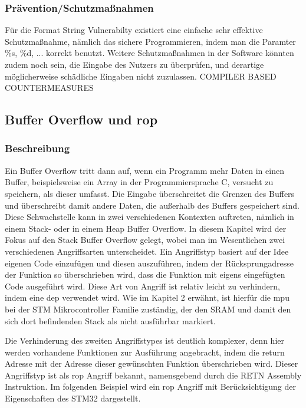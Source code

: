 \documentclass[a4paper,
DIV=13,
12pt,
BCOR=10mm,
department=FakIM,
oneside,
parskip=half,
automark,
listof=totocnumbered,
bibliography=totocnumbered,
acronym=totocnumbered
] {OTHRartcl}
\begin{document}
\subsubsection{Prävention/Schutzmaßnahmen}
Für die Format String Vulnerabilty existiert eine einfache sehr effektive Schutzmaßnahme, nämlich
das sichere Programmieren, indem man die Paramter \%s, \%d, ... korrekt benutzt.
Weitere Schutzmaßnahmen in der Software könnten zudem noch sein, die Eingabe des Nutzers zu überprüfen, und
derartige möglicherweise schädliche Eingaben nicht zuzulassen.
COMPILER BASED COUNTERMEASURES

\subsection{Buffer Overflow und \ac{rop}}
\subsubsection{Beschreibung}
Ein Buffer Overflow tritt dann auf, wenn ein Programm mehr Daten in einen Buffer, beispielsweise ein Array in der Programmiersprache C, versucht zu speichern, als
dieser umfasst.
Die Eingabe überschreitet die Grenzen des Buffers und überschreibt damit andere Daten, die außerhalb des Buffers gespeichert sind.
Diese Schwachstelle kann in zwei verschiedenen Kontexten auftreten, nämlich in einem Stack- oder in einem Heap Buffer Overflow.
In diesem Kapitel wird der Fokus auf den Stack Buffer Overflow gelegt, wobei man im Wesentlichen zwei verschiedenen Angriffsarten unterscheidet.
Ein Angriffstyp basiert auf der Idee eigenen Code einzufügen und diesen auszuführen, indem der Rücksprungadresse der Funktion so überschrieben wird, dass die Funktion
mit eigens eingefügten Code ausgeführt wird. Diese Art von Angriff ist relativ leicht zu verhindern, indem eine \ac{dep} verwendet wird.
Wie im Kapitel 2 erwähnt, ist hierfür die \ac{mpu} bei der STM Mikrocontroller Familie zuständig, der den SRAM und damit den sich dort befindenden Stack als nicht ausführbar markiert.

Die Verhinderung des zweiten Angriffstypes ist deutlich komplexer, denn hier werden vorhandene Funktionen zur Ausführung angebracht, indem die return Adresse mit der Adresse
dieser gewünschten Funktion überschrieben wird. %
Dieser Angriffstyp ist als \ac{rop} Angriff bekannt, namensgebend durch die RETN Assembly Instruktion.
Im folgenden Beispiel wird ein \ac{rop} Angriff mit Berücksichtigung der Eigenschaften des STM32 dargestellt.
\end{document}
